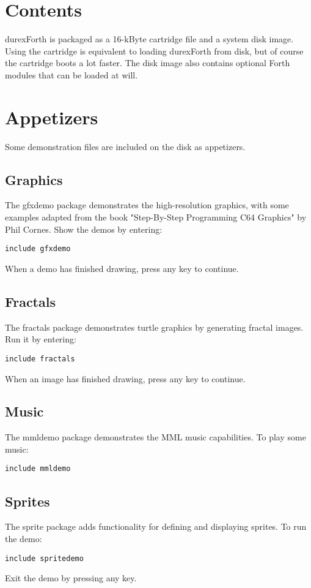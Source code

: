 \section{Contents}

durexForth is packaged as a 16-kByte cartridge file and a system disk image. Using the cartridge is equivalent to loading durexForth from disk, but of course the cartridge boots a lot faster. The disk image also contains optional Forth modules that can be loaded at will.

\section{Appetizers}

Some demonstration files are included on the disk as appetizers.

\subsection{Graphics}

The gfxdemo package demonstrates the high-resolution graphics, with some examples adapted from the book "Step-By-Step Programming C64 Graphics" by Phil Cornes.
Show the demos by entering:

\texttt{include gfxdemo}

When a demo has finished drawing, press any key to continue.

\subsection{Fractals}

The fractals package demonstrates turtle graphics by generating fractal images. Run it by entering:

\texttt{include fractals}

When an image has finished drawing, press any key to continue.

\subsection{Music}

The mmldemo package demonstrates the MML music capabilities. To play some music:

\texttt{include mmldemo}

\subsection{Sprites}

The sprite package adds functionality for defining and displaying sprites. To run the demo:

\texttt{include spritedemo}

Exit the demo by pressing any key.
